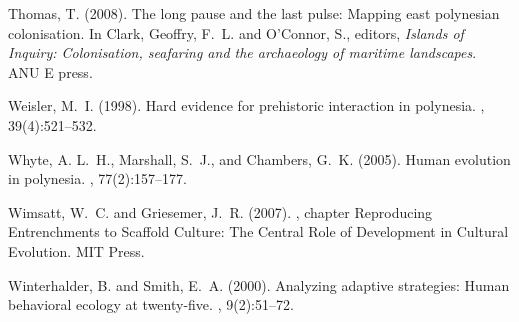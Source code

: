 Thomas, T. (2008).
\newblock The long pause and the last pulse: Mapping east polynesian
  colonisation.
\newblock In Clark, Geoffry, F.~L. and O'Connor, S., editors, {\em Islands of
  Inquiry: Colonisation, seafaring and the archaeology of maritime landscapes}.
  ANU E press.

Weisler, M.~I. (1998).
\newblock Hard evidence for prehistoric interaction in polynesia.
, 39(4):521--532.

Whyte, A. L.~H., Marshall, S.~J., and Chambers, G.~K. (2005).
\newblock Human evolution in polynesia.
, 77(2):157--177.

Wimsatt, W.~C. and Griesemer, J.~R. (2007).
,
  chapter Reproducing Entrenchments to Scaffold Culture: The Central Role of
  Development in Cultural Evolution.
\newblock MIT Press.

Winterhalder, B. and Smith, E.~A. (2000).
\newblock Analyzing adaptive strategies: Human behavioral ecology at
  twenty-five.
,
  9(2):51--72.

